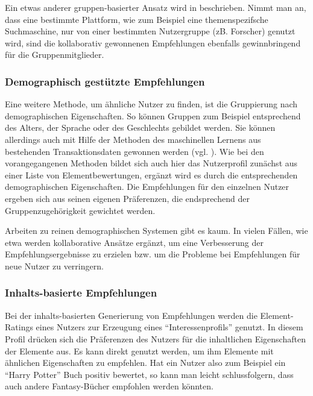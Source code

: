 Ein etwas anderer gruppen-basierter Ansatz wird in \citep{smyth05a} beschrieben. Nimmt man an, dass eine bestimmte Plattform, wie zum Beispiel eine themenspezifsche Suchmaschine, nur von einer bestimmten Nutzergruppe (zB. Forscher) genutzt wird, sind die kollaborativ gewonnenen Empfehlungen ebenfalls gewinnbringend für die Gruppenmitglieder.

\subsubsection{Demographisch gestützte Empfehlungen}
Eine weitere Methode, um ähnliche Nutzer zu finden, ist die Gruppierung nach demographischen Eigenschaften. So können Gruppen zum Beispiel entsprechend des Alters, der Sprache oder des Geschlechts gebildet werden. Sie können allerdings auch mit Hilfe der Methoden des maschinellen Lernens aus bestehenden Transaktionsdaten gewonnen werden (vgl. \citep{Burke:2002:HRS:586321.586352}). Wie bei den vorangegangenen Methoden bildet sich auch hier das Nutzerprofil zunächst aus einer Liste von Elementbewertungen, ergänzt wird es durch die entsprechenden demographischen Eigenschaften. Die Empfehlungen für den einzelnen Nutzer ergeben sich aus seinen eigenen Präferenzen, die endsprechend der Gruppenzugehörigkeit gewichtet werden.

Arbeiten zu reinen demographischen Systemen gibt es kaum. In vielen Fällen, wie etwa \citep{Vozalis:2007:USD:1243505.1243639} werden kollaborative Ansätze ergänzt, um eine Verbesserung der Empfehlungsergebnisse zu erzielen bzw. um die Probleme bei Empfehlungen für neue Nutzer zu verringern. \citep{Burke:2002:HRS:586321.586352}

\subsubsection{Inhalts-basierte Empfehlungen}
Bei der inhalts-basierten Generierung von Empfehlungen werden die Element-Ratings eines Nutzers zur Erzeugung eines ``Interessenprofils'' genutzt. In diesem Profil drücken sich die Präferenzen des Nutzers für die inhaltlichen Eigenschaften der Elemente aus. Es kann direkt genutzt werden, um ihm Elemente mit ähnlichen Eigenschaften zu empfehlen. Hat ein Nutzer also zum Beispiel ein ``Harry Potter'' Buch positiv bewertet, so kann man leicht schlussfolgern, dass auch andere Fantasy-Bücher empfohlen werden könnten.

